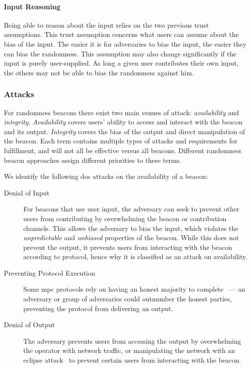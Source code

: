 \paragraph{Input Reasoning}
Being able to reason about the input relies on the two previous trust assumptions.
This trust assumption concerns what users can assume about the bias of the input.
The easier it is for adversaries to bias the input, the easier they can bias the randomness.
This assumption may also change significantly if the input is purely user-supplied.
As long a given user contributes their own input, the others may not be able to bias the randomness against him.

\subsubsection{Attacks}\label{ssub:security_objectives}
For randomness beacons there exist two main venues of attack: \emph{availability} and \emph{integrity}.
\emph{Availability} covers users' ability to access and interact with the beacon and its output.
\emph{Integrity} covers the bias of the output and direct manipulation of the beacon.
Each term contains multiple types of attacks and requirements for fulfillment, and will not all be effective versus all beacons. Different randomness beacon approaches assign different priorities to these terms.

We identify the following \gls{dos} attacks on the availability of a beacon:

\begin{description}
    \item[Denial of Input]
For beacons that use user input, the adversary can seek to prevent other users from contributing by overwhelming the beacon or contribution channels.
This allows the adversary to bias the input, which violates the \emph{unpredictable} and \emph{unbiased} properties of the beacon.
While this does not prevent the output, it prevents users from interacting with the beacon according to protocol, hence why it is classified as an attack on availability.

    \item[Preventing Protocol Execution]
Some \gls{mpc} protocols rely on having an honest majority to complete~\cite{cascudo2017scrape} --- an adversary or group of adversaries could outnumber the honest parties, preventing the protocol from delivering an output.

    \item[Denial of Output]
The adversary prevents users from accessing the output by overwhelming the operator with network traffic, or manipulating the network with an eclipse attack~\cite{Singh06eclipseattacks} to prevent certain users from interacting with the beacon.

\end{description}

